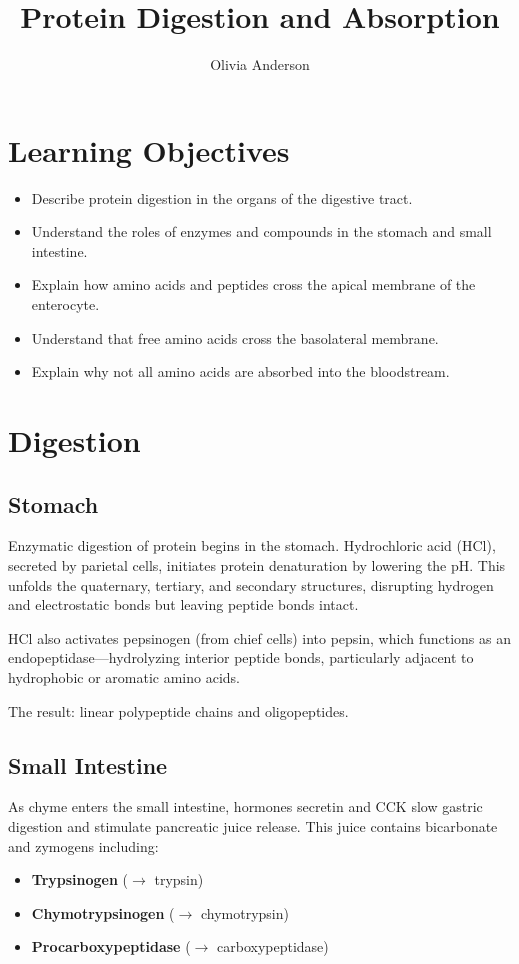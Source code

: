 \documentclass{tufte-handout}
\title{Protein Digestion and Absorption}
\author{Olivia Anderson}
\date{}  %
\begin{document}
\maketitle

\section*{Learning Objectives}
\begin{itemize}
  \item Describe protein digestion in the organs of the digestive tract.
  \item Understand the roles of enzymes and compounds in the stomach and small intestine.
  \item Explain how amino acids and peptides cross the apical membrane of the enterocyte.
  \item Understand that free amino acids cross the basolateral membrane.
  \item Explain why not all amino acids are absorbed into the bloodstream.
\end{itemize}

\section{Digestion}

\subsection{Stomach}
Enzymatic digestion of protein begins in the stomach. Hydrochloric acid (HCl), secreted by parietal cells, initiates protein denaturation by lowering the pH. This unfolds the quaternary, tertiary, and secondary structures, disrupting hydrogen and electrostatic bonds but leaving peptide bonds intact.

HCl also activates pepsinogen (from chief cells) into pepsin, which functions as an endopeptidase—hydrolyzing interior peptide bonds, particularly adjacent to hydrophobic or aromatic amino acids.

The result: linear polypeptide chains and oligopeptides.

\subsection{Small Intestine}
As chyme enters the small intestine, hormones secretin and CCK slow gastric digestion and stimulate pancreatic juice release. This juice contains bicarbonate and zymogens including:
\begin{itemize}
  \item \textbf{Trypsinogen} ($\rightarrow$ trypsin)
  \item \textbf{Chymotrypsinogen} ($\rightarrow$ chymotrypsin)
  \item \textbf{Procarboxypeptidase} ($\rightarrow$ carboxypeptidase)
\end{itemize}
\end{document}
